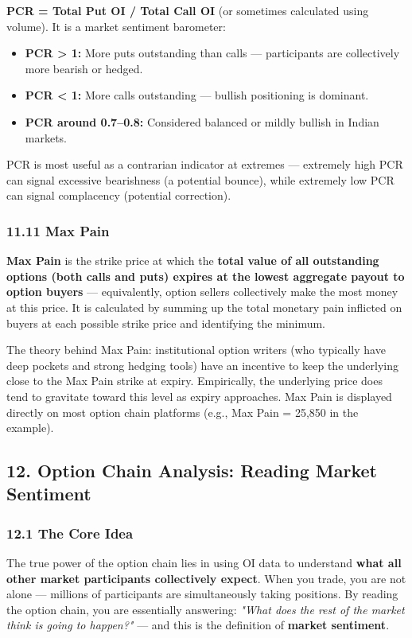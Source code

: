 \documentclass[12pt,openany]{book}
\begin{document}
\textbf{PCR = Total Put OI / Total Call OI} (or sometimes calculated using volume). It is a market sentiment barometer:

\begin{itemize}[leftmargin=*]
    \item \textbf{PCR > 1:} More puts outstanding than calls — participants are collectively more bearish or hedged.
    \item \textbf{PCR < 1:} More calls outstanding — bullish positioning is dominant.
    \item \textbf{PCR around 0.7–0.8:} Considered balanced or mildly bullish in Indian markets.
\end{itemize}

PCR is most useful as a contrarian indicator at extremes — extremely high PCR can signal excessive bearishness (a potential bounce), while extremely low PCR can signal complacency (potential correction).

\subsubsection{11.11 Max Pain}

\textbf{Max Pain} is the strike price at which the \textbf{total value of all outstanding options (both calls and puts) expires at the lowest aggregate payout to option buyers} — equivalently, option sellers collectively make the most money at this price. It is calculated by summing up the total monetary pain inflicted on buyers at each possible strike price and identifying the minimum.

The theory behind Max Pain: institutional option writers (who typically have deep pockets and strong hedging tools) have an incentive to keep the underlying close to the Max Pain strike at expiry. Empirically, the underlying price does tend to gravitate toward this level as expiry approaches. Max Pain is displayed directly on most option chain platforms (e.g., Max Pain = 25,850 in the example).


\subsection{12. Option Chain Analysis: Reading Market Sentiment}

\subsubsection{12.1 The Core Idea}

The true power of the option chain lies in using OI data to understand \textbf{what all other market participants collectively expect}. When you trade, you are not alone — millions of participants are simultaneously taking positions. By reading the option chain, you are essentially answering: \emph{"What does the rest of the market think is going to happen?"} — and this is the definition of \textbf{market sentiment}.
\end{document}
